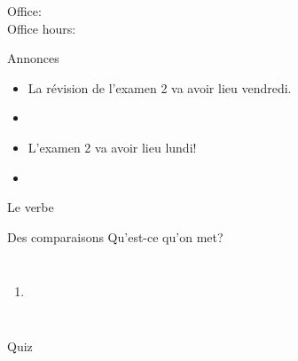 \documentclass{beamer}
\subtitle[\lexi{Mettre} et adjectifs démonstratifs]{Le verbe \lexi{mettre} et les adjectifs démonstratifs}
\begin{document}
  \begin{frame}
    \titlepage
    \tiny{Office: \\
          Office hours: }
  \end{frame}

  \begin{frame}{Annonces}
    \begin{itemize}
      \item La révision de l'examen 2 va avoir lieu vendredi.
      \item[] 
      \item L'examen 2 va avoir lieu lundi!
      \item[] 
    \end{itemize}
  \end{frame}

  \begin{frame}{Le verbe}
    \begin{center}
      
    \end{center}
  \end{frame}

  \begin{frame}[t]{Des comparaisons}
    Qu'est-ce qu'on met?
    \vspace{0.5cm}
    \begin{columns}
        \begin{enumerate}
          \item \underline{}
        \end{enumerate}
        \begin{center}
        \end{center}
    \end{columns}
  \end{frame}

  \begin{frame}{}
    \begin{center}
      \Large Quiz
    \end{center}
  \end{frame}
\end{document}
